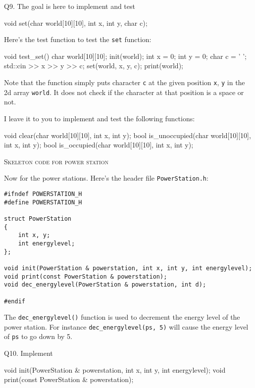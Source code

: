 {\newpage
Q9.
The goal is here to implement and test
\begin{console}
void set(char world[10][10], int x, int y, char c);
\end{console}

Here's the test function to test the \verb!set! function:
\begin{console}
void test_set()
{
    char world[10][10];
    init(world);
    int x = 0;
    int y = 0;
    char c = ' ';
    std::cin >> x >> y >> c;
    set(world, x, y, c);
    print(world);
}
\end{console}
Note that the function simply puts character \verb!c! at the given position
\verb!x!, \verb!y! in the 2d array \verb!world!.
It does not check if the character at that position is a space or not.

I leave it to you to implement and test the following functions:
\begin{console}[commandchars=\\\{\}]
void clear(char world[10][10], int x, int y);
bool is_unoccupied(char world[10][10], int x, int y);
bool is_occupied(char world[10][10], int x, int y);
\end{console}


  
\newpage
\textsc{Skeleton code for power station}

Now for the power stations.
Here's the header file \verb!PowerStation.h!:
\begin{Verbatim}[frame=single]
#ifndef POWERSTATION_H
#define POWERSTATION_H

struct PowerStation
{
    int x, y;
    int energylevel;
};

void init(PowerStation & powerstation, int x, int y, int energylevel);
void print(const PowerStation & powerstation);
void dec_energylevel(PowerStation & powerstation, int d);

#endif
\end{Verbatim}

The \verb!dec_energylevel()! function is used to decrement the energy level
of the power station.
For instance \verb!dec_energylevel(ps, 5)!
will cause the energy level of \verb!ps! to go down by 5.




\newpage
Q10.
Implement
\begin{console}
void init(PowerStation & powerstation, int x, int y, int energylevel);
void print(const PowerStation & powerstation);
\end{console}

}
